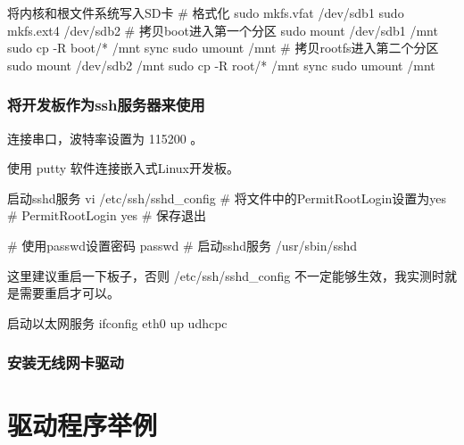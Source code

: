 \documentclass[lang=cn,newtx,10pt,scheme=chinese]{elegantbook}
\begin{document}
\begin{mycode}{将内核和根文件系统写入SD卡}
# 格式化
sudo mkfs.vfat /dev/sdb1
sudo mkfs.ext4 /dev/sdb2
# 拷贝boot进入第一个分区
sudo mount /dev/sdb1 /mnt
sudo cp -R boot/* /mnt
sync
sudo umount /mnt
# 拷贝rootfs进入第二个分区
sudo mount /dev/sdb2 /mnt
sudo cp -R root/* /mnt
sync
sudo umount /mnt
\end{mycode}

\section{将开发板作为ssh服务器来使用}

连接串口，波特率设置为 115200 。

使用 putty 软件连接嵌入式Linux开发板。

\begin{mycode}{启动sshd服务}
vi /etc/ssh/sshd_config
# 将文件中的PermitRootLogin设置为yes
# PermitRootLogin yes
# 保存退出

# 使用passwd设置密码
passwd
# 启动sshd服务
/usr/sbin/sshd
\end{mycode}

\begin{marker}
这里建议重启一下板子，否则 /etc/ssh/sshd\_config 不一定能够生效，我实测时就是需要重启才可以。
\end{marker}


\begin{mycode}{启动以太网服务}
ifconfig eth0 up
udhcpc
\end{mycode}

\section{安装无线网卡驱动}


\part{驱动程序举例}
\end{document}

